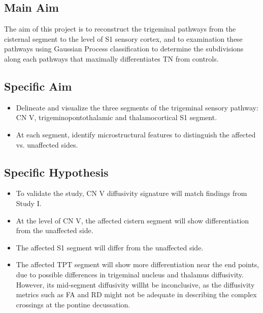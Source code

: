 \subsection{Main Aim}
The aim of this project is to reconstruct the trigeminal pathways from the cisternal segment to the level of S1 sensory cortex, and to examination these pathways using Gaussian Process classification to determine the subdivisions along each pathways that maximally differentiates TN from controls.


\subsection{Specific Aim}
\begin{itemize}
    \item Delineate and visualize the three segments of the trigeminal sensory pathway: CN V, trigeminopontothalamic and  thalamocortical S1 segment. 
    \item At each segment, identify microstructural features to distinguish the affected vs. unaffected sides.
\end{itemize}

\subsection{Specific Hypothesis}
\begin{itemize}
    \item To validate the study, CN V diffusivity signature will match findings from Study I.
    \item At the level of CN V, the affected cistern segment will show differentiation from the unaffected side.
    \item The affected S1 segment will differ from the unaffected side.
    \item The affected TPT segment will show more differentiation near the end points, due to possible differences in trigeminal nucleus and thalamus diffusivity. However, its mid-segment diffusivity willht be inconclusive, as the diffusivity metrics such as FA and RD might not be adequate in describing the complex crossings at the pontine decussation. 
\end{itemize}
